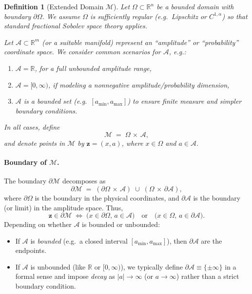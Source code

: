 \documentclass[12pt]{article}
\newtheorem{definition}[theorem]{Definition}
\begin{document}
\begin{definition}[Extended Domain \(\mathcal{M}\)]
\label{def:extended_domain}
Let \(\Omega \subset \mathbb{R}^n\) be a bounded domain with boundary \(\partial \Omega\). 
We assume \(\Omega\) is sufficiently regular (e.g.\ Lipschitz or \(C^{1,\alpha}\)) so that 
standard fractional Sobolev space theory applies.

Let \(\mathcal{A} \subset \mathbb{R}^m\) (or a suitable manifold) represent an ``amplitude'' 
or ``probability'' coordinate space. We consider common scenarios for \(\mathcal{A}\), e.g.:
\begin{enumerate}
    \item \(\mathcal{A} = \mathbb{R}\), for a full unbounded amplitude range,
    \item \(\mathcal{A} = [0,\infty)\), if modeling a nonnegative amplitude/probability dimension,
    \item \(\mathcal{A}\) is a \emph{bounded} set (e.g.\ \([a_{\min}, a_{\max}]\)) to ensure finite measure and simpler boundary conditions.
\end{enumerate}
In all cases, define
\[
\mathcal{M} \;=\; \Omega \,\times\, \mathcal{A},
\]
and denote points in \(\mathcal{M}\) by \(\mathbf{z} = (x,a)\), where \(x \in \Omega\) 
and \(a \in \mathcal{A}\).
\end{definition}

\paragraph{Boundary of \(\mathcal{M}\).}
The boundary \(\partial \mathcal{M}\) decomposes as
\[
\partial \mathcal{M}
\;=\;
(\partial \Omega \,\times\, \mathcal{A})
\;\cup\;
(\Omega \,\times\, \partial \mathcal{A}),
\]
where \(\partial \Omega\) is the boundary in the physical coordinates, and 
\(\partial \mathcal{A}\) is the boundary (or limit) in the amplitude space. Thus,
\[
\mathbf{z} \in \partial \mathcal{M}
\;\Longleftrightarrow\;
\bigl(x \in \partial \Omega,\, a \in \mathcal{A}\bigr)
\quad\text{or}\quad
\bigl(x \in \Omega,\, a \in \partial \mathcal{A}\bigr).
\]
Depending on whether \(\mathcal{A}\) is bounded or unbounded:

\begin{itemize}
    \item If \(\mathcal{A}\) is \emph{bounded} (e.g.\ a closed interval \([a_{\min}, a_{\max}]\)), 
          then \(\partial \mathcal{A}\) are the endpoints.  
    \item If \(\mathcal{A}\) is unbounded (like \(\mathbb{R}\) or \([0,\infty)\)), we typically define 
          \(\partial \mathcal{A} \equiv \{\pm\infty\}\) in a formal sense and impose \emph{decay} as 
          \(\lvert a\rvert \to \infty\) (or \(a \to \infty\)) rather than a strict boundary condition.
\end{itemize}
\end{document}
